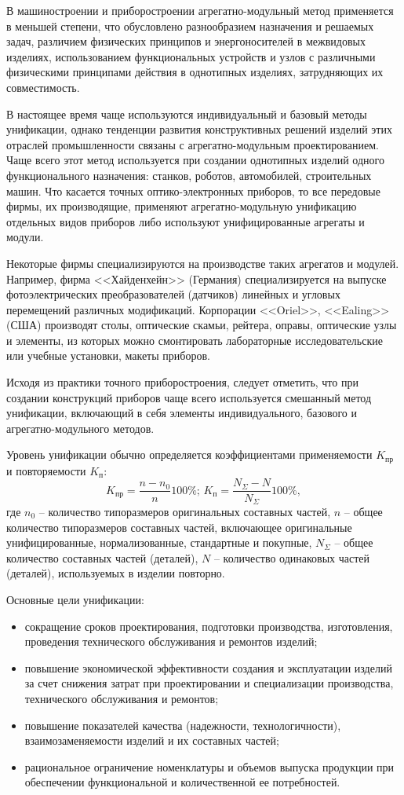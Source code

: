 \begin{enumerate}
В машиностроении и приборостроении агрегатно-модульный метод применяется в меньшей степени, что обусловлено разнообразием назначения и решаемых задач, различием физических принципов и энергоносителей в межвидовых изделиях, использованием функциональных устройств и узлов с различными физическими принципами действия в однотипных изделиях, затрудняющих их совместимость. 

В настоящее время чаще используются индивидуальный и базовый методы унификации, однако тенденции развития конструктивных решений изделий этих отраслей промышленности связаны с агрегатно-модульным проектированием. Чаще всего этот метод используется при создании однотипных изделий одного функционального назначения: станков, роботов, автомобилей, строительных машин. Что касается точных оптико-электронных приборов, то все передовые фирмы, их производящие, применяют агрегатно-модульную унификацию отдельных видов приборов либо используют унифицированные агрегаты и модули.

Некоторые фирмы специализируются на производстве таких агрегатов и модулей. Например, фирма <<Хайденхейн>> (Германия) специализируется на выпуске фотоэлектрических преобразователей (датчиков) линейных и угловых перемещений различных модификаций. Корпорации <<Oriel>>, <<Ealing>> (США) производят столы, оптические скамьи, рейтера, оправы, оптические узлы и элементы, из которых можно смонтировать лабораторные исследовательские или учебные установки, макеты приборов.

Исходя из практики точного приборостроения, следует отметить, что при создании конструкций приборов чаще всего используется смешанный метод унификации, включающий в себя элементы индивидуального, базового и агрегатно-модульного методов.

Уровень унификации обычно определяется коэффициентами применяемости $ K_\text{пр} $ и повторяемости $ K_\text{п} $:
\[ K_\text{пр} = \dfrac{n-n_0}{n}100\% ; \, K_\text{п} = \dfrac{N_\Sigma - N}{N_\Sigma} 100\%,   \]
где $ n_0 $ -- количество типоразмеров оригинальных составных частей, $ n $ -- общее количество типоразмеров составных частей, включающее оригинальные унифицированные, нормализованные, стандартные и покупные, $ N_\Sigma $ -- общее количество составных частей (деталей), $ N $ -- количество одинаковых частей (деталей), используемых в изделии повторно.

Основные цели унификации:
\begin{itemize}
\item сокращение сроков проектирования, подготовки производства, изготовления, проведения технического обслуживания и ремонтов изделий;
\item повышение экономической эффективности создания и эксплуатации изделий за счет снижения затрат при проектировании и специализации производства, технического обслуживания и ремонтов;
\item повышение показателей качества (надежности, технологичности), взаимозаменяемости изделий и их составных частей;
\item рациональное ограничение номенклатуры и объемов выпуска продукции при обеспечении функциональной и количественной ее потребностей.
\end{itemize}


\end{enumerate}
